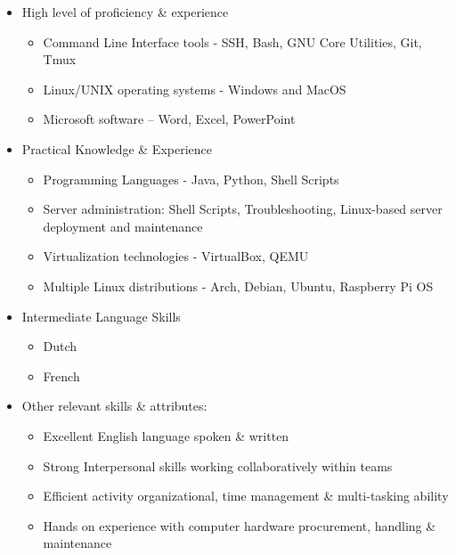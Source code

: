 \begin{cvparagraph}



\begin{multicols}{2}


	\vspace{-\topsep}
	\begin{itemize}
		\setlength{\parskip}{0pt}
		\setlength{\itemsep}{0pt plus 1pt}

		\item{High level of proficiency \& experience}
			\begin{itemize}
					\item{Command Line Interface tools - SSH, Bash, GNU Core Utilities, Git, Tmux}
					\item{Linux/UNIX operating systems - Windows and MacOS}
					\item{Microsoft software – Word, Excel, PowerPoint}
			\end{itemize}
		\item{Practical Knowledge \& Experience}
			\begin{itemize}
				\item{Programming Languages - Java, Python, Shell Scripts}
				\item{Server administration: Shell Scripts, Troubleshooting, Linux-based server deployment and maintenance}
				\item{Virtualization technologies - VirtualBox, QEMU}
				\item{Multiple Linux distributions - Arch, Debian, Ubuntu, Raspberry Pi OS}
			\end{itemize}
		\item{Intermediate Language Skills}
			\begin{itemize}
				\item{Dutch}
				\item{French}
			\end{itemize}
		\item{Other relevant skills \& attributes:}
			\begin{itemize}
				\item{Excellent English language spoken \& written}
				\item{Strong Interpersonal skills working collaboratively within teams}
				\item{Efficient activity organizational, time management \& multi-tasking ability}
				\item{Hands on experience with computer hardware procurement, handling \& maintenance}
			\end{itemize}


\end{itemize}
\end{multicols}
\end{cvparagraph}
